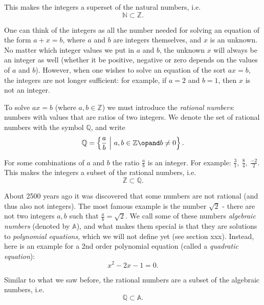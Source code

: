 This makes the integers a superset of the natural numbers, i.e.
\begin{equation}
	\mathbb{N} \subset \mathbb{Z}.
	\label{eq:naturals_subset_integers}
\end{equation}

One can think of the integers as all the number needed for solving an equation of the form $a+x=b$, where $a$ and $b$ are integers themselves, and $x$ is an unknown. No matter which integer values we put in $a$ and $b$, the unknown $x$ will always be an integer as well (whether it be positive, negative or zero depends on the values of $a$ and $b$). However, when one wishes to solve an equation of the sort $ax=b$, the integers are not longer sufficient: for example, if $a=2$ and $b=1$, then $x$ is not an integer.

To solve $ax=b$ (where $a,b\in\mathbb{Z}$) we must introduce the \emph{rational numbers}: numbers with values that are ratios of two integers. We denote the set of rational numbers with the symbol $\mathbb{Q}$, and write
\begin{equation}
	\mathbb{Q} = \left\{ \frac{a}{b} \ \middle\vert\ a,b\in\mathbb{Z} \opand b\neq0  \right\}.
	\label{eq:rationals}
\end{equation}

For some combinations of $a$ and $b$ the ratio $\frac{a}{b}$ is an integer. For example: $\frac{3}{1},\ \frac{8}{4},\ \frac{-2}{2}$. This makes the integers a subset of the rational numbers, i.e.
\begin{equation}
	\mathbb{Z}\subset\mathbb{Q}.
	\label{eq:integers_subset_rationals}
\end{equation}

About 2500 years ago it was discovered that some numbers are not rational (and thus also not integers). The most famous example is the number $\sqrt{2}$ - there are not two integers $a,b$ such that $\frac{a}{b}=\sqrt{2}$. We call some of these numbers \emph{algebraic numbers} (denoted by $\mathbb{A}$), and what makes them special is that they are solutions to \emph{polynomial equations}, which we will not define yet (see section xxx). Instead, here is an example for a 2nd order polynomial equation (called a \emph{quadratic equation}):
\begin{equation}
	x^{2} - 2x - 1 = 0.
	\label{eq:quadratic_equation}
\end{equation}

Similar to what we saw before, the rational numbers are a subset of the algebraic numbers, i.e.
\begin{equation}
	\mathbb{Q}\subset\mathbb{A}.
	\label{eq:rationals_subset_algebraic}
\end{equation}

